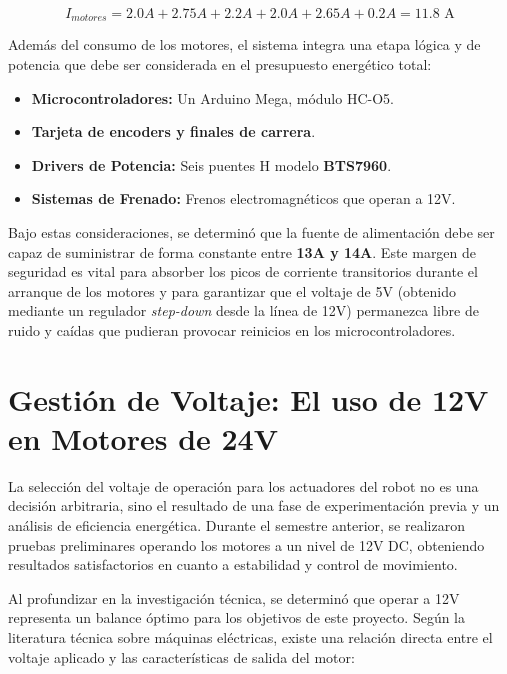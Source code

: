 \[ I_{motores} = 2.0A + 2.75A + 2.2A + 2.0A + 2.65A + 0.2A = 11.8 \text{ A} \]

Además del consumo de los motores, el sistema integra una etapa lógica y de potencia que debe ser considerada en el presupuesto energético total:
\begin{itemize}
	\item \textbf{Microcontroladores:} Un Arduino Mega, módulo HC-O5.
	\item \textbf{Tarjeta de encoders y finales de carrera}. 
	\item \textbf{Drivers de Potencia:} Seis puentes H modelo \textbf{BTS7960}.
	\item \textbf{Sistemas de Frenado:} Frenos electromagnéticos que operan a 12V.
\end{itemize}

Bajo estas consideraciones, se determinó que la fuente de alimentación debe ser capaz de suministrar de forma constante entre \textbf{13A y 14A}. Este margen de seguridad es vital para absorber los picos de corriente transitorios durante el arranque de los motores y para garantizar que el voltaje de 5V (obtenido mediante un regulador \textit{step-down} desde la línea de 12V) permanezca libre de ruido y caídas que pudieran provocar reinicios en los microcontroladores.

\section{Gestión de Voltaje: El uso de 12V en Motores de 24V}

La selección del voltaje de operación para los actuadores del robot no es una decisión arbitraria, sino el resultado de una fase de experimentación previa y un análisis de eficiencia energética. Durante el semestre anterior, se realizaron pruebas preliminares operando los motores a un nivel de 12V DC, obteniendo resultados satisfactorios en cuanto a estabilidad y control de movimiento.

Al profundizar en la investigación técnica, se determinó que operar a 12V representa un balance óptimo para los objetivos de este proyecto. Según la literatura técnica sobre máquinas eléctricas, existe una relación directa entre el voltaje aplicado y las características de salida del motor:

